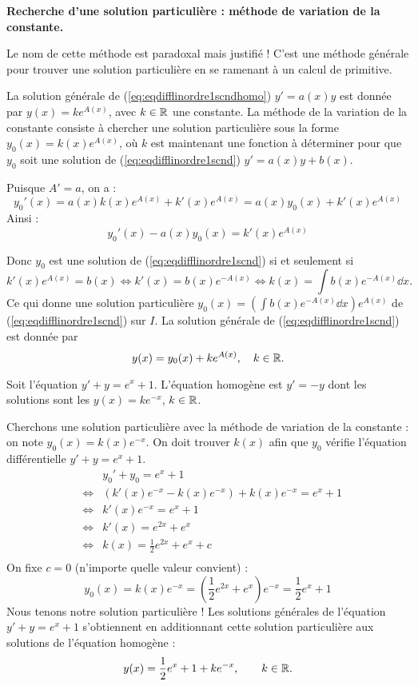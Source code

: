 \documentclass[class=report,crop=false]{standalone}
\begin{document}
\textbf{Recherche d'une solution particulière : méthode de variation de la constante.}

Le nom de cette méthode est paradoxal mais justifié !
C'est une méthode générale pour trouver une solution
particulière en se ramenant à un calcul de primitive.

La solution générale de (\ref{eq:eqdifflinordre1scndhomo}) $y' = a(x) y$ est donnée
par $y(x)=ke^{A(x)}$, avec $k\in \mathbb{R}$ une constante.
La méthode de la variation de la constante consiste à chercher
une solution particulière sous la forme $y_0(x)=k(x)e^{A(x)}$,
où $k$ est maintenant une fonction à déterminer pour que
$y_0$ soit une solution de (\ref{eq:eqdifflinordre1scnd}) $y' = a(x) y  + b(x)$.

Puisque $A'=a$, on a :
$$y_0'(x)=a(x)k(x)e^{A(x)} + k'(x)e^{A(x)}= a(x)y_0(x) + k'(x)e^{A(x)}$$
Ainsi :
$$y_0'(x) - a(x)y_0(x) = k'(x)e^{A(x)}$$

Donc $y_0$ est une solution de (\ref{eq:eqdifflinordre1scnd}) si et seulement si
$$k'(x)e^{A(x)}=b(x) \iff k'(x)=b(x)e^{-A(x)} \iff k(x)=\int b(x)e^{-A(x)}\dd x.$$
Ce qui donne une solution particulière
$y_0(x) = \left(\int b(x)e^{-A(x)}\dd x \right)e^{A(x)}$ de (\ref{eq:eqdifflinordre1scnd})
sur $I$.
La solution générale de  (\ref{eq:eqdifflinordre1scnd}) est donnée par
$$y(x) = y_0(x) + ke^{A(x)}, \quad k\in \mathbb{R}.$$


\begin{exemple}
\label{ex:eqdifflinordre1scnd}
Soit l'équation $y'+y = e^x+1$.
L'équation homogène est $y'=-y$ dont les solutions sont
les $y(x) = k e^{-x}$, $k\in\mathbb{R}$.

Cherchons une solution particulière avec la méthode de variation de la constante :
on note $y_0(x) = k(x) e^{-x}$. On doit trouver $k(x)$ afin que $y_0$ vérifie l'équation
différentielle $y'+y = e^x+1$.
$$\begin{array}{rcl}
        && y_0'+y_0 = e^x+1  \\
 & \iff & \left(k'(x) e^{-x} - k(x) e^{-x} \right) + k(x) e^{-x} = e^x+1 \\
 & \iff & k'(x)e^{-x} = e^x+1 \\
 & \iff & k'(x) = e^{2x}+e^x \\
 & \iff & k(x) = \frac12e^{2x}+e^x + c \\
\end{array}$$
On fixe $c=0$ (n'importe quelle valeur convient) :
$$y_0(x) =  k(x) e^{-x} = \left(\frac12e^{2x}+e^x\right)e^{-x} = \frac12e^{x}+1$$
Nous tenons notre solution particulière ! Les solutions générales de l'équation
$y'+y = e^x+1$ s'obtiennent en additionnant cette solution particulière aux solutions
de l'équation homogène :
$$y(x) = \frac12e^{x}+1 + k e^{-x}, \qquad k\in\mathbb{R}.$$
\end{exemple}
\end{document}
